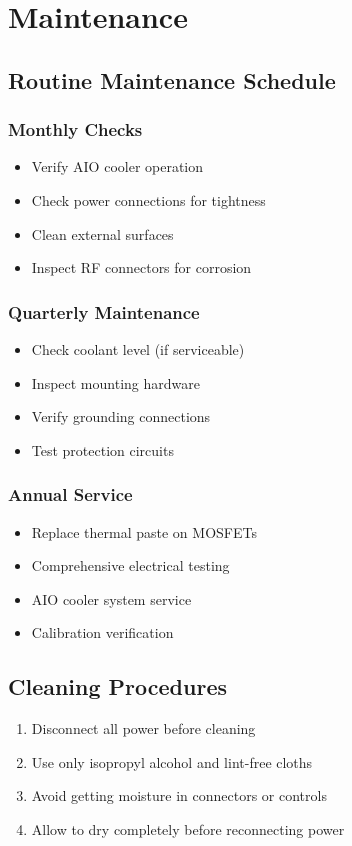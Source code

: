 \documentclass[11pt,a4paper]{article}
\begin{document}
\section{Maintenance}

\subsection{Routine Maintenance Schedule}

\subsubsection{Monthly Checks}
\begin{itemize}
    \item Verify AIO cooler operation
    \item Check power connections for tightness
    \item Clean external surfaces
    \item Inspect RF connectors for corrosion
\end{itemize}

\subsubsection{Quarterly Maintenance}
\begin{itemize}
    \item Check coolant level (if serviceable)
    \item Inspect mounting hardware
    \item Verify grounding connections
    \item Test protection circuits
\end{itemize}

\subsubsection{Annual Service}
\begin{itemize}
    \item Replace thermal paste on MOSFETs
    \item Comprehensive electrical testing
    \item AIO cooler system service
    \item Calibration verification
\end{itemize}

\subsection{Cleaning Procedures}
\begin{enumerate}
    \item Disconnect all power before cleaning
    \item Use only isopropyl alcohol and lint-free cloths
    \item Avoid getting moisture in connectors or controls
    \item Allow to dry completely before reconnecting power
\end{enumerate}
\end{document}
